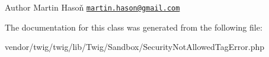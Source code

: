 \begin{DoxyAuthor}{Author}
Martin Hasoň \href{mailto:martin.hason@gmail.com}{\tt martin.\+hason@gmail.\+com} 
\end{DoxyAuthor}


The documentation for this class was generated from the following file\+:\begin{DoxyCompactItemize}
\item 
vendor/twig/twig/lib/\+Twig/\+Sandbox/Security\+Not\+Allowed\+Tag\+Error.\+php\end{DoxyCompactItemize}
